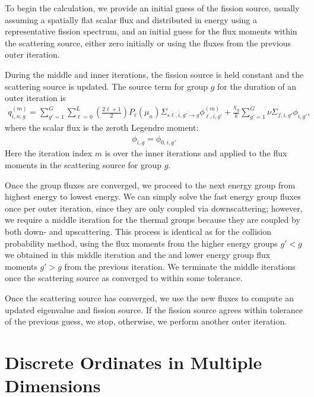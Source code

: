 To begin the calculation, we provide an initial guess of the fission source, usually assuming a spatially flat scalar flux and distributed in energy using a representative fission spectrum, and an initial guess for the flux moments within the scattering source, either zero initially or using the fluxes from the previous outer iteration. 

During the middle and inner iterations, the fission source is held constant and the scattering source is updated. The source term for group $g$ for the duration of an outer iteration is
\begin{align}
  q_{i,n,g}^{(m)} = \sum_{g'=1}^G \sum_{\ell=0}^L \left( \frac{2\ell+1}{2} \right) P_\ell(\mu_n) \Sigma_{s\ell,i,g' \rightarrow g} \phi_{\ell,i,g'}^{(m)} + \frac{\chi_g}{k}  \sum_{g'=1}^G \nu\Sigma_{f,i,g'} \phi_{i,g'},
\end{align}
where the scalar flux is the zeroth Legendre moment:
\begin{align}
  \phi_{i,g} = \phi_{0,i,g} .
\end{align}
Here the iteration index $m$ is over the inner iterations and applied to the flux moments in the scattering source for group $g$. 

Once the group fluxes are converged, we proceed to the next energy group from highest energy to lowest energy. We can simply solve the fast energy group fluxes once per outer iteration, since they are only coupled via downscattering; however, we require a middle iteration for the thermal groups because they are coupled by both down- and upscattering. This process is identical as for the collision probability method, using the flux moments from the higher energy groups $g' < g$ we obtained in this middle iteration and the and lower energy group flux moments $g' > g$ from the previous iteration. We terminate the middle iterations once the scattering source as converged to within some tolerance.

Once the scattering source has converged, we use the new fluxes to compute an updated eigenvalue and fission source. If the fission source agrees within tolerance of the previous guess, we stop, otherwise, we perform another outer iteration.





\section{Discrete Ordinates in Multiple Dimensions}

